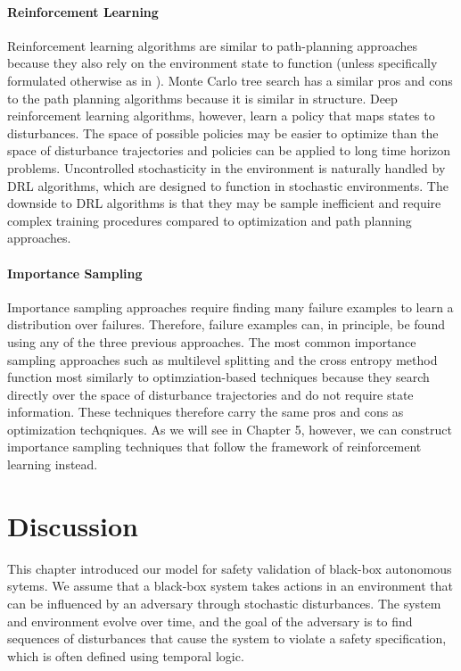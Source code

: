\paragraph{Reinforcement Learning} Reinforcement learning algorithms are similar to path-planning approaches because they also rely on the environment state to function (unless specifically formulated otherwise as in \textcite{koren2019adaptive}). Monte Carlo tree search has a similar pros and cons to the path planning algorithms because it is similar in structure. Deep reinforcement learning algorithms, however, learn a policy that maps states to disturbances. The space of possible policies may be easier to optimize than the space of disturbance trajectories and policies can be applied to long time horizon problems. Uncontrolled stochasticity in the environment is naturally handled by DRL algorithms, which are designed to function in stochastic environments. The downside to DRL algorithms is that they may be sample inefficient and require complex training procedures compared to optimization and path planning approaches. 


\paragraph{Importance Sampling}
Importance sampling approaches require finding many failure examples to learn a distribution over failures. Therefore, failure examples can, in principle, be found using any of the three previous approaches. The most common importance sampling approaches such as multilevel splitting and the cross entropy method function most similarly to optimziation-based techniques because they search directly over the space of disturbance trajectories and do not require state information. These techniques therefore carry the same pros and cons as optimization techqniques. As we will see in Chapter 5, however, we can construct importance sampling techniques that follow the framework of reinforcement learning instead. 

\section{Discussion}
This chapter introduced our model for safety validation of black-box autonomous sytems. We assume that a black-box system takes actions in an environment that can be influenced by an adversary through stochastic disturbances. The system and environment evolve over time, and the goal of the adversary is to find sequences of disturbances that cause the system to violate a safety specification, which is often defined using temporal logic.

